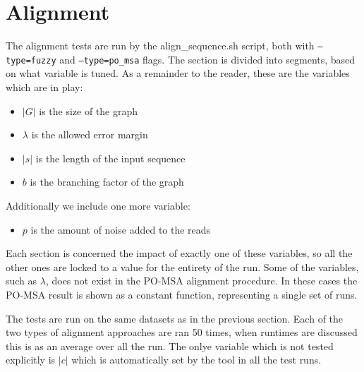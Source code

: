 \documentclass[thesis.tex]{subfiles}
\begin{document}
\section{Alignment}
The alignment tests are run by the align\_sequence.sh script, both with \texttt{--type=fuzzy} and \texttt{--type=po\_msa} flags. The section is divided into segments, based on what variable is tuned. As a remainder to the reader, these are the variables which are in play:
\begin{itemize}
  \item $|G|$ is the size of the graph
  \item $\lambda$ is the allowed error margin
  \item $|s|$ is the length of the input sequence
  \item $b$ is the branching factor of the graph
\end{itemize}
Additionally we include one more variable:
\begin{itemize}
  \item $p$ is the amount of noise added to the reads
\end{itemize}
Each section is concerned the impact of exactly one of these variables, so all the other ones are locked to a value for the entirety of the run. Some of the variables, such as $\lambda$, does not exist in the PO-MSA alignment procedure. In these cases the PO-MSA result is shown as a constant function, representing a single set of runs.\\
\par\noindent
The tests are run on the same datasets as in the previous section. Each of the two types of alignment approaches are ran 50 times, when runtimes are discussed this is as an average over all the run. The onlye variable which is not tested explicitly is $|c|$ which is automatically set by the tool in all the test runs.
\end{document}
